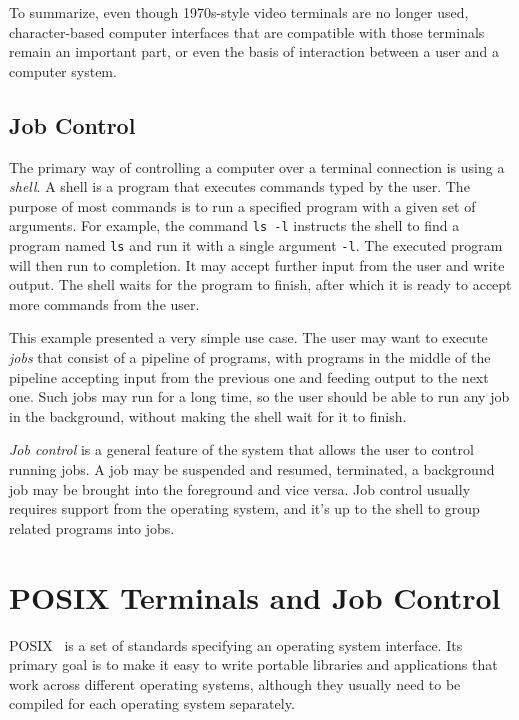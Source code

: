 \documentclass[shortabstract, manyadvisors, english, mgr]{iithesis}
\begin{document}
To summarize, even though 1970s-style video terminals are no longer used,
character-based computer interfaces that are compatible with those terminals
remain an important part, or even the basis of interaction between a user and a
computer system.

\section{Job Control}

The primary way of controlling a computer over a terminal connection is using a
\textit{shell}. A shell is a program that executes commands typed by the user.
The purpose of most commands is to run a specified program with a given set of
arguments. For example, the command \texttt{ls -l} instructs the shell to find a
program named \texttt{ls} and run it with a single argument \texttt{-l}.
The executed program will then run to completion. It may accept further input
from the user and write output. The shell waits for the program to finish, after
which it is ready to accept more commands from the user.

This example presented a very simple use case.
The user may want to execute \textit{jobs} that consist of a pipeline of
programs, with programs in the middle of the pipeline accepting input from the
previous one and feeding output to the next one. Such jobs may run for a long
time, so the user should be able to run any job in the background, without
making the shell wait for it to finish.

\textit{Job control} is a general feature of the system that allows the user to
control running jobs. A job may be suspended and resumed, terminated, a
background job may be brought into the foreground and vice versa. Job control
usually requires support from the operating system, and it's up to the shell to
group related programs into jobs.

\chapter{POSIX Terminals and Job Control}

POSIX~\cite{posix} is a set of standards specifying an operating system
interface. Its primary goal is to make it easy to write portable libraries and
applications that work across different operating systems, although they usually
need to be compiled for each operating system separately.
\end{document}
